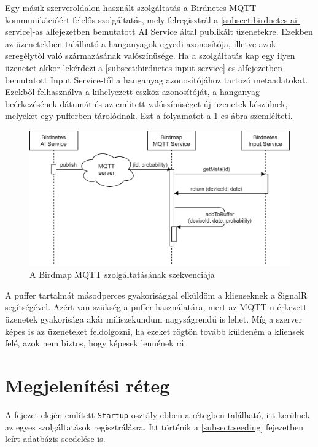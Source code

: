 Egy másik szerveroldalon használt szolgáltatás a Birdnetes MQTT kommunikációért felelős szolgáltatás, 
mely felregisztrál a \ref{subsect:birdnetes-ai-service}-as alfejezetben bemutatott AI Service által publikált üzenetekre.
Ezekben az üzenetekben található a hanganyagok egyedi azonosítója, illetve azok seregélytől való származásának valószínüsége.
Ha a szolgáltatás kap egy ilyen üzenetet akkor lekérdezi a \ref{subsect:birdnetes-input-service}-es alfejezetben bemutatott Input Service-től
a hanganyag azonosítójához tartozó metaadatokat. 
Ezekből felhasználva a kihelyezett eszköz azonosítóját, a hanganyag beérkezésének dátumát és az említett valószínüséget új üzenetek készülnek, melyeket egy pufferben tárolódnak.
Ezt a folyamatot a \ref{fig:birdmap-mqtt-service}-es ábra szemlélteti.

\begin{figure}[!ht]
    \centering
    \includegraphics[width=150mm, keepaspectratio]{figures/mqtt-communication-sequence.png}
    \caption{A Birdmap MQTT szolgáltatásának szekvenciája}
    \label{fig:birdmap-mqtt-service}
\end{figure}

A puffer tartalmát másodperces gyakorisággal elküldöm a klienseknek a SignalR segítségével. 
Azért van szükség a puffer használatára, mert az MQTT-n érkezett üzenetek gyakorisága akár miliszekundum nagyságrendű is lehet. 
Míg a szerver képes is az üzeneteket feldolgozni, ha ezeket rögtön tovább küldeném a kliensek felé, azok nem biztos, hogy képesek lennének rá.

\section{Megjelenítési réteg}
A fejezet elején említett \verb+Startup+ osztály ebben a rétegben található, itt kerülnek az egyes szolgáltatások regisztrálásra.
Itt történik a \ref{subsect:seeding} fejezetben leírt adatbázis seedelése is.

